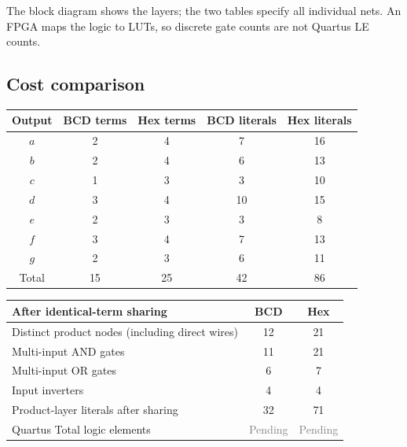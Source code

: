 \documentclass[a4paper,11pt]{article}
\newcommand{\pending}{\textcolor{gray}{Pending}}
\begin{document}
\begin{center}\end{center}

The block diagram shows the layers; the two tables specify all individual nets. An FPGA maps the logic to LUTs, so discrete gate counts are not Quartus LE counts.

\clearpage\subsection{Cost comparison}

\begin{center}\small
\begin{tabular}{ccccc}
\toprule
Output & BCD terms & Hex terms & BCD literals & Hex literals\\\midrule
$a$ & 2 & 4 & 7 & 16\\
$b$ & 2 & 4 & 6 & 13\\
$c$ & 1 & 3 & 3 & 10\\
$d$ & 3 & 4 & 10 & 15\\
$e$ & 2 & 3 & 3 & 8\\
$f$ & 3 & 4 & 7 & 13\\
$g$ & 2 & 3 & 6 & 11\\
Total & 15 & 25 & 42 & 86\\
\bottomrule\end{tabular}\end{center}


\begin{center}\small
\begin{tabular}{lcc}
\toprule
After identical-term sharing & BCD & Hex\\\midrule
Distinct product nodes (including direct wires) & 12 & 21\\
Multi-input AND gates & 11 & 21\\
Multi-input OR gates & 6 & 7\\
Input inverters & 4 & 4\\
Product-layer literals after sharing & 32 & 71\\
Quartus Total logic elements & \pending & \pending\\
\bottomrule\end{tabular}\end{center}
\end{document}
